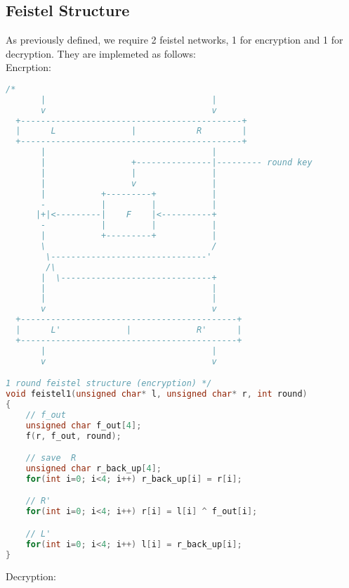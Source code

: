 \documentclass{article}
\begin{document}
\subsection{Feistel Structure}
As previously defined, we require 2 feistel networks, 1 for encryption and 1 for decryption. They are implemeted as follows:\\
Encrption:
\begin{lstlisting}[language=c]
/*
       |                                 |
       v                                 v
  +--------------------------------------------+
  |      L               |            R        |
  +--------------------------------------------+
       |                                 |
       |                 +---------------|--------- round key
       |                 |               |
       |                 v               |
       |           +---------+           |
       -           |         |           |
      |+|<---------|    F    |<----------+
       -           |         |           |
       |           +---------+           |
       \                                 /
        \-------------------------------'
        /\ 
       |  \------------------------------+
       |                                 |
       |                                 |
       v                                 v
  +-------------------------------------------+
  |      L'             |             R'      |
  +-------------------------------------------+
       |                                 |
       v                                 v

1 round feistel structure (encryption) */
void feistel1(unsigned char* l, unsigned char* r, int round)
{
    // f_out
    unsigned char f_out[4];
    f(r, f_out, round);

    // save  R
    unsigned char r_back_up[4];
    for(int i=0; i<4; i++) r_back_up[i] = r[i];

    // R'
    for(int i=0; i<4; i++) r[i] = l[i] ^ f_out[i];

    // L'
    for(int i=0; i<4; i++) l[i] = r_back_up[i];
}
\end{lstlisting}
Decryption:
\end{document}
